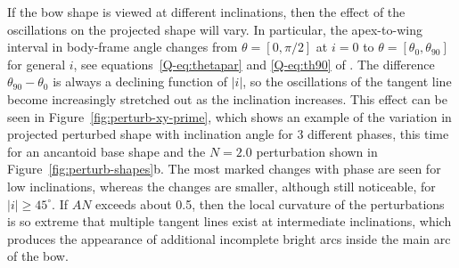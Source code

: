 If the bow shape is viewed at different inclinations, then the effect
of the oscillations on the projected shape will vary.  In particular,
the apex-to-wing interval in body-frame angle changes from
\(\theta = [0, \pi/2]\) at \(i = 0\) to
\(\theta = [\theta_0, \theta_{90}]\) for general \(i\), see
equations~\eqref{Q-eq:thetapar} and \eqref{Q-eq:th90} of \PaperI{}.
The difference \(\theta_{90} - \theta_0\) is always a declining function of
\(|i|\), so the oscillations of the tangent line become increasingly
stretched out as the inclination increases.  This effect can be seen
in Figure~\ref{fig:perturb-xy-prime}, which shows an example of the
variation in projected perturbed shape with inclination angle for 3
different phases, this time for an ancantoid base shape and the
\(N = 2.0\) perturbation shown in Figure~\ref{fig:perturb-shapes}b.
The most marked changes with phase are seen for low inclinations,
whereas the changes are smaller, although still noticeable, for
\(|i| \ge 45^\circ\). If \(A N\) exceeds about 0.5, then the local curvature
of the perturbations is so extreme that multiple tangent lines exist
at intermediate inclinations, which produces the appearance of
additional incomplete bright arcs inside the main arc of the bow.

